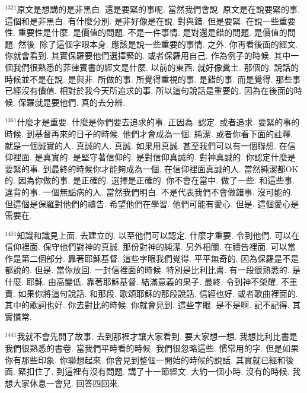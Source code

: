 \documentclass{book}
\begin{document}
$^{1321}$原文是想講的是非黑白.
還是要緊的事呢.
當然我們會說.
原文是在說要緊的事.
這個和是非黑白.
有什麼分別.
是非好像是在說.
對與錯.
但是要緊.
在說一些重要性.
重要性是什麼.
是價值的問題.
不是一件事情.
是對還是錯的問題.
是價值的問題.
然後.
除了這個字眼本身.
應該是說一些重要的事情.
之外.
你再看後面的經文.
你就會看到.
其實保羅要他們選擇緊的.
或者保羅用自己.
作為例子的時候.
其中一個我們很熟悉的菲律賓書的經文是什麼.
以前的東西.
就好像糞土.
那個的.
說話的時候並不是在說.
是與非.
所做的事.
所覺得重視的事.
是錯的事.
而是覺得.
那些事已經沒有價值.
相對於我今天所追求的事.
所以這句說話是重要的.
因為在後面的時候.
保羅就是要他們.
真的去分辨.

$^{1361}$什麼才是重要.
什麼是你們要去追求的事.
正因為.
認定.
或者追求.
要緊的事的時候.
到基督再來的日子的時候.
他們才會成為一個.
純潔.
或者你看下面的註釋.
就是一個誠實的人.
真誠的人.
真誠.
如果用真誠.
甚至我們可以有一個聯想.
在信仰裡面.
是真實的.
是堅守著信仰的.
是對信仰真誠的.
對神真誠的.
你認定什麼是要緊的事.
到最終的時候你才能夠成為一個.
在信仰裡面真誠的人.
當然純潔都OK的.
因為你做的事.
是正確的.
選擇是正確的.
你不會在當中.
做了一些.
和這些事.
違背的事.
一個無詬病的人.
當然我們明白.
不是代表我們不會做錯事.
沒可能的.
但這個是保羅對他們的禱告.
希望他們在學習.
他們可能有愛心.
但是.
這個愛心是需要在.

$^{1401}$知識和識見上面.
去建立的.
以至他們可以認定.
什麼才重要.
令到他們.
可以在信仰裡面.
保守他們對神的真誠.
那份對神的純潔.
另外相關.
在禱告裡面.
可以當作是第二個部分.
靠著耶穌基督.
這些字眼我們覺得.
平平無奇的.
因為保羅是不是都說的.
但是.
當你放回.
一封信裡面的時候.
特別是比利比書.
有一段很熟悉的.
是什麼.
耶穌.
由高變低.
靠著耶穌基督.
結滿意義的果子.
最終.
令到神不榮耀.
不重責.
如果你將這句說話.
和那段.
歌頌耶穌的那段說話.
信經也好.
或者歌曲裡面的.
其中的歌詞也好.
你去對比的時候.
你就會見到.
這些字眼.
是不是啊.
記不記得.
其實慣常.

$^{1441}$我就不會先開了故事.
去到那裡才讓大家看到.
要大家想一想.
我想比利比書是我們很熟悉的書卷.
當我們平時看的時候.
我們很忽略這些.
慣常用的字.
但是如果你有那些印象.
你聯想起來.
你會見到整個一開始的時候的說話.
其實就已經和後面.
緊扣住了.
到這裡有沒有問題.
講了十一節經文.
大約一個小時.
沒有的時候.
我想大家休息一會兒.
回答四回來.
\newpage
\end{document}
